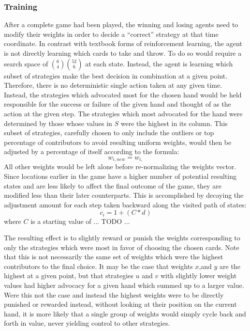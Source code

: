 
\subsubsection{Training}





After a complete game had been played, the winning and losing agents need to
modify their weights in order to decide a ``correct'' strategy at that time
coordinate.
%
In contrast with textbook forms of reinforcement learning,
the agent is not directly learning which cards to take and throw.
%
To do so would require a search space of ${6 \choose 4}{52 \choose 6}$
at each state.
%
Instead, the agent is learning which subset of strategies make the best
decision in combination at a given point.
%
Therefore, there is no deterministic single action taken at any given
time.
%
Instead, the strategies which advocated most for the chosen hand would be held
responsible for the success or failure of the given hand and thought of as
the action at the given step.
%
The strategies which most advocated for the hand were determined by those whose
values in $S$ were the highest in its column.
%
This subset of strategies,
carefully chosen to only include the outliers or top percentage of contributors
to avoid resulting uniform weights,
would then be adjusted by a percentage of itself according to the formula:
\[
	w_{i,new} = w_{i,}
\]
%
All other weights would be left alone before re-normalizing the weights vector.
%
Since locations earlier in the game have a higher number of potential resulting
states and are less likely to affect the final outcome of the game,
they are modified less than their later counterparts.
%
This is accomplished by decaying the adjustment amount for each step taken
backward along the visited path of states:
\[
	c_i = 1 + (C * d^{})
\]
where $C$ is a starting value of ... TODO ...

The resulting effect is to slightly reward or punish the weights
corresponding to only the strategies which were most in favor of choosing
the chosen cards.
%
Note that this is not necessarily the same set of weights which were the highest
contributors to the final choice.
%
It may be the case that weights $x$,and $y$ are the highest at a given point,
but that strategies $u$ and $v$ with slightly lower weight values had higher
advocacy for a given hand which summed up to a larger value.
%
Were this not the case and instead the highest weights were to be directly
punished or rewarded instead,
without looking at their position on the current hand,
it is more likely that a single group of weights would simply cycle
back and forth in value, never yielding control to other strategies.

